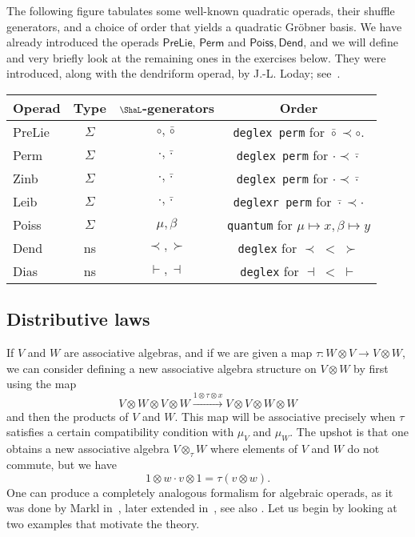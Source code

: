 The following figure tabulates some well-known
quadratic operads, their shuffle generators,
and a choice of order that yields a quadratic
Gr\"obner basis. We have already introduced the
operads $\mathsf{PreLie}$, $\mathsf{Perm}$ and
$\mathsf{Poiss},\mathsf{Dend}$, 
and we will define and
very briefly look at the
remaining ones
in the exercises below.
They were introduced, along with
the dendriform operad, by
J.-L. Loday; see~\cite{LodayDialg, LodayLeib}.

\begin{center}
\begin{tabular}{@{}lccc@{}} \toprule
Operad & Type & $\Sha$-generators & Order \\
\midrule 
PreLie & $\Sigma$ & $\circ,\bar\circ$ & 
	\texttt{deglex perm} for $\bar\circ \prec \circ$.\\
Perm &   $\Sigma$ & $\cdot,\bar\cdot$ &
	\texttt{deglex perm} for $\cdot \prec \bar \cdot$  \\
Zinb &  $\Sigma$  & $\cdot,\bar\cdot$ &
	\texttt{deglex perm} for $\cdot \prec \bar \cdot$ \\

Leib &  $\Sigma$  & $\cdot,\bar\cdot$ & 
	\texttt{deglexr perm} for $\bar\cdot \prec \cdot$\\

Poiss &   $\Sigma$ & $\mu,\beta$ & \texttt{quantum} for $\mu\mapsto x,\beta\mapsto y$ \\
Dend &  ns  & $\prec,\succ$ & \texttt{deglex} for $\prec\; < \;\succ$\\
Dias &   ns  & $\vdash,\dashv$ & \texttt{deglex} for $\dashv\; < \; \vdash$\\
\bottomrule
\end{tabular}
\end{center}




\subsection{Distributive laws}

If $V$ and $W$ are associative algebras, and if we
are given a map $\tau : W\otimes V\longrightarrow V\otimes W$,
we can consider defining a new associative algebra structure
on $V\otimes W$ by first using the map
\[
V\otimes W\otimes V\otimes W 
	\xrightarrow{1\otimes \tau\otimes x}
	 V\otimes V\otimes W\otimes W
	 \]
and then the products of $V$ and $W$. This map will be
associative precisely when $\tau$ satisfies a certain
compatibility condition with $\mu_V$ and $\mu_W$. The upshot
is that one obtains a new associative algebra
$V\otimes_\tau W$ where elements of $V$ and $W$ do not
commute, but we have
\[ 1\otimes w\cdot v\otimes 1 = \tau(v\otimes w).
\]
One can produce a completely analogous formalism 
for algebraic operads, as it was done by Markl 
in~\cite{MarklDistributive}, later extended
in~\cite{Vallette2004,Dotsenko2007},
see also \cite{Dotsenko2014}. Let us begin by 
looking at two examples that motivate
the theory.

